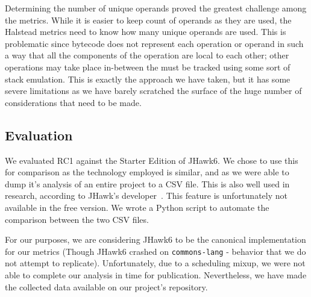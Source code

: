 Determining the number of unique operands proved the greatest challenge among the metrics. While it is easier to keep count of operands as they are used, the Halstead metrics need to know how many unique operands are used. This is problematic since bytecode does not represent each operation or operand in such a way that all the components of the operation are local to each other; other operations may take place in-between the must be tracked using some sort of stack emulation. This is exactly the approach we have taken, but it has some severe limitations as we have barely scratched the surface of the huge number of considerations that need to be made.

\subsection{Evaluation}
We evaluated RC1 against the Starter Edition of JHawk6. We chose to use this for comparison as the technology employed is similar, and as we were able to dump it's analysis of an entire project to a CSV file. This is also well used in research, according to JHawk's developer~\cite{jhawk_academic_papers}. This feature is unfortunately not available in the free version. We wrote a Python script to automate the comparison between the two CSV files.

For our purposes, we are considering JHawk6 to be the canonical implementation for our metrics (Though JHawk6 crashed on \texttt{commons-lang} - behavior that we do not attempt to replicate). Unfortunately, due to a scheduling mixup, we were not able to complete our analysis in time for publication. Nevertheless, we have made the collected data available on our project's repository.


